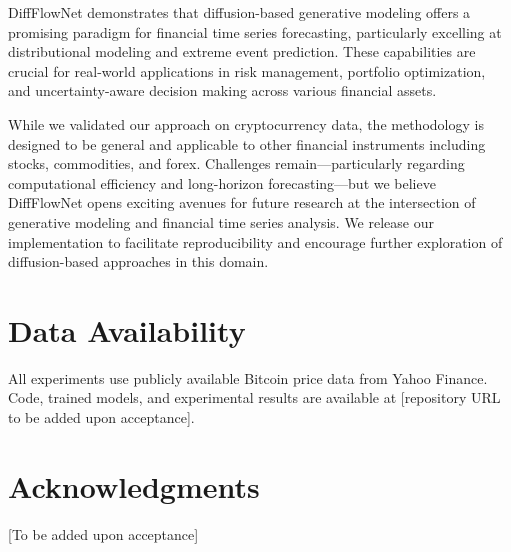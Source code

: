 \documentclass[11pt,a4paper]{article}
\begin{document}
DiffFlowNet demonstrates that diffusion-based generative modeling offers a promising paradigm for financial time series forecasting, particularly excelling at distributional modeling and extreme event prediction. These capabilities are crucial for real-world applications in risk management, portfolio optimization, and uncertainty-aware decision making across various financial assets.

While we validated our approach on cryptocurrency data, the methodology is designed to be general and applicable to other financial instruments including stocks, commodities, and forex. Challenges remain—particularly regarding computational efficiency and long-horizon forecasting—but we believe DiffFlowNet opens exciting avenues for future research at the intersection of generative modeling and financial time series analysis. We release our implementation to facilitate reproducibility and encourage further exploration of diffusion-based approaches in this domain.

\section*{Data Availability}

All experiments use publicly available Bitcoin price data from Yahoo Finance. Code, trained models, and experimental results are available at [repository URL to be added upon acceptance].

\section*{Acknowledgments}

[To be added upon acceptance]
\end{document}

